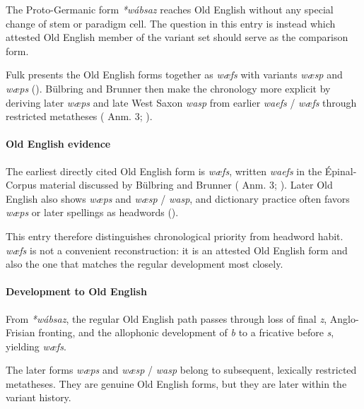 \documentclass[
  british,
  a4paper,
]{article}
\begin{document}
The Proto-Germanic form \emph{*wábsaz} reaches Old English without any
special change of stem or paradigm cell. The question in this entry is
instead which attested Old English member of the variant set should
serve as the comparison form.

Fulk presents the Old English forms together as \emph{wæfs} with
variants \emph{wæsp} and \emph{wæps} (). Bülbring and Brunner then make the chronology more explicit
by deriving later \emph{wæps} and late West Saxon \emph{wasp} from
earlier \emph{waefs} / \emph{wæfs} through restricted metatheses
( Anm. 3;
).

\paragraph{Old English evidence}\label{old-english-evidence-3}

The earliest directly cited Old English form is \emph{wæfs}, written
\emph{waefs} in the Épinal-Corpus material discussed by Bülbring and
Brunner ( Anm. 3;
). Later Old
English also shows \emph{wæps} and \emph{wæsp} / \emph{wasp}, and
dictionary practice often favors \emph{wæps} or later spellings as
headwords ().

This entry therefore distinguishes chronological priority from headword
habit. \emph{wæfs} is not a convenient reconstruction: it is an attested
Old English form and also the one that matches the regular development
most closely.

\paragraph{Development to Old
English}\label{development-to-old-english-3}

From \emph{*wábsaz}, the regular Old English path passes through loss of
final \emph{z}, Anglo-Frisian fronting, and the allophonic development
of \emph{b} to a fricative before \emph{s}, yielding \emph{wæfs}.

The later forms \emph{wæps} and \emph{wæsp} / \emph{wasp} belong to
subsequent, lexically restricted metatheses. They are genuine Old
English forms, but they are later within the variant history.
\end{document}
